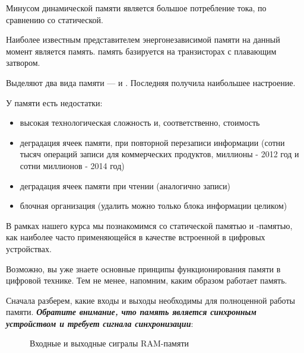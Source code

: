 \par{Минусом динамической памяти является большое потребление тока, по сравнению со статической.}

\vspace{4mm}

\par{Наиболее известным представителем энергонезависимой памяти на данный момент является  память.  память базируется на транзисторах с плавающим затвором.}

\par{Выделяют два вида  памяти —  и . Последняя получила наибольшее настроение.}

\par{У  памяти есть недостатки:}
  \begin{itemize}[noitemsep,topsep=0pt, after=\vspace{2pt}]
    \item высокая технологическая сложность и, соответственно, стоимость
    \item деградация ячеек памяти, при повторной перезаписи информации  (сотни тысяч операций записи для коммерческих продуктов, миллионы - 2012 год и сотни миллионов - 2014 год)
    \item деградация ячеек памяти при чтении (аналогично записи)
    \item блочная организация (удалить можно только блока информации целиком)
  \end{itemize}

\par{В рамках нашего курса мы познакомимся со статической памятью и -памятью, как наиболее часто применяющейся в качестве встроенной в цифровых устройствах.}

\par{Возможно, вы уже знаете основные принципы функционирования памяти в цифровой технике. Тем не менее, напомним, каким образом работает  память.}

\par{Сначала разберем, какие входы и выходы необходимы для полноценной работы памяти. \textbf{\textit{Обратите внимание, что память является синхронным устройством и требует сигнала синхронизации}}:}

\begin{figure}[H]
	\centering
	\def\svgwidth{\columnwidth}
	
	\caption{Входные и выходные сигралы RAM-памяти}
\end{figure}

